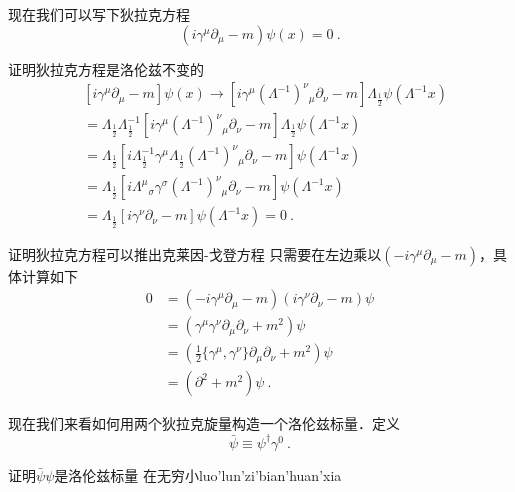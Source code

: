 现在我们可以写下狄拉克方程
\begin{equation}
(i\gamma^\mu \partial_\mu - m)\psi(x)=0~.
\end{equation}
\begin{exercise}{证明狄拉克方程是洛伦兹不变的}
\begin{align}\nonumber
& [i\gamma^\mu\partial_\mu - m]\psi(x)\rightarrow [i\gamma^\mu(\Lambda^{-1})^\nu{}_\mu\partial_\nu - m]\Lambda_{\frac{1}{2}}\psi(\Lambda^{-1}x) \\\nonumber
& = \Lambda_{\frac{1}{2}}\Lambda^{-1}_{\frac{1}{2}}[i\gamma^\mu(\Lambda^{-1})^\nu{}_\mu\partial_\nu-m]\Lambda_{\frac{1}{2}}\psi(\Lambda^{-1}x) \\\nonumber
& =  \Lambda_{\frac{1}{2}}[i\Lambda_{\frac{1}{2}}^{-1}\gamma^\mu \Lambda_{\frac{1}{2}}(\Lambda^{-1})^\nu{}_\mu\partial_\nu - m]\psi(\Lambda^{-1}x) \\\nonumber
& = \Lambda_{\frac{1}{2} } [i\Lambda^\mu{}_\sigma\gamma^\sigma(\Lambda^{-1})^\nu{}_\mu\partial_\nu - m]\psi(\Lambda^{-1}x) \\
& = \Lambda_{\frac{1}{2}} [i \gamma^\nu\partial_\nu - m]\psi(\Lambda^{-1}x) = 0~.
\end{align}
\end{exercise}
\begin{exercise}{证明狄拉克方程可以推出克莱因-戈登方程}
只需要在左边乘以$(-i\gamma^\mu\partial_\mu - m)$，具体计算如下
\begin{align}\nonumber
0 & =(-i\gamma^\mu\partial_\mu-m)(i\gamma^\nu\partial_\nu-m)\psi \\\nonumber
& = (\gamma^\mu\gamma^\nu\partial_\mu\partial_\nu+m^2)\psi \\\nonumber
& = (\frac{1}{2}\{\gamma^\mu,\gamma^\nu\}\partial_\mu\partial_\nu+m^2)\psi \\
& = (\partial^2+m^2)\psi ~.
\end{align}
\end{exercise}
现在我们来看如何用两个狄拉克旋量构造一个洛伦兹标量．定义
\begin{equation}
\bar \psi \equiv \psi^\dagger \gamma^0~.
\end{equation}
\begin{exercise}{证明$\bar\psi \psi$是洛伦兹标量}
在无穷小luo'lun'zi'bian'huan'xia
\end{exercise}




